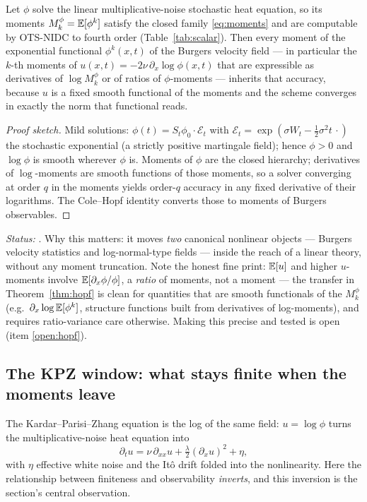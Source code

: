 \begin{theorem}\label{thm:hopf}
Let $\phi$ solve the linear multiplicative-noise stochastic heat equation, so
its moments $M_k^\phi = \mathbb{E}[\phi^k]$ satisfy the closed family \eqref{eq:moments}
and are computable by OTS-NIDC to fourth order (Table~\ref{tab:scalar}).
Then every moment of the exponential functional $\phi^k(x,t)$ of the Burgers
velocity field --- in particular the $k$-th moments of
$u(x,t) = -2\nu\,\partial_x\log\phi(x,t)$ that are expressible as
derivatives of $\log M_k^\phi$ or of ratios of $\phi$-moments --- inherits that
accuracy, because $u$ is a fixed smooth functional of the moments and the
scheme converges in exactly the norm that functional reads.
\end{theorem}
\begin{proof}[Proof sketch]
Mild solutions: $\phi(t) = S_t\phi_0\cdot\mathcal{E}_t$ with
$\mathcal{E}_t = \exp(\sigma W_t - \frac12\sigma^2 t\,\cdot)$ the stochastic
exponential (a strictly positive martingale field); hence $\phi>0$ and
$\log\phi$ is smooth wherever $\phi$ is. Moments of $\phi$ are the closed
hierarchy; derivatives of $\log$-moments are smooth functions of those moments,
so a solver converging at order $q$ in the moments yields order-$q$ accuracy in
any fixed derivative of their logarithms. The Cole--Hopf identity converts
those to moments of Burgers observables.
\end{proof}
\noindent\emph{Status:} \tagP. Why this matters: it moves \emph{two} canonical
nonlinear objects --- Burgers velocity statistics and log-normal-type fields
--- inside the reach of a linear theory, without any moment truncation. Note
the honest fine print: $\mathbb{E}[u]$ and higher $u$-moments involve
$\mathbb{E}[\partial_x\phi/\phi]$, a \emph{ratio} of moments, not a moment --- the
transfer in Theorem~\ref{thm:hopf} is clean for quantities that are smooth
functionals of the $M_k^\phi$ (e.g.\ $\partial_x \log \mathbb{E}[\phi^k]$, structure
functions built from derivatives of log-moments), and requires ratio-variance
care otherwise. Making this precise and tested is open (item \ref{open:hopf}).

\subsection{The KPZ window: what stays finite when the moments leave}

The Kardar--Parisi--Zhang equation is the log of the same field:
$u = \log\phi$ turns the multiplicative-noise heat equation into
\begin{equation}\label{eq:kpz}
\partial_t u = \nu\,\partial_{xx}u + \tfrac{\lambda}2(\partial_x u)^2 + \eta ,
\end{equation}
with $\eta$ effective white noise and the It\^o drift folded into the
nonlinearity. Here the relationship between finiteness and observability
\emph{inverts}, and this inversion is the section's central observation.

